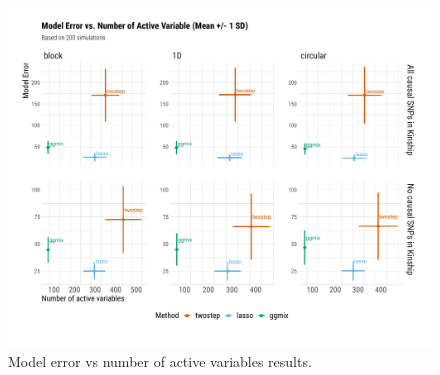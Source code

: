 \documentclass[12pt,letter]{article}\usepackage[]{graphicx}\usepackage[]{color}
\newenvironment{knitrout}{}{} %
\begin{document}
\begin{knitrout}\scriptsize
{}\color{fgcolor}\begin{figure}[H]

{\centering \includegraphics[width=1\linewidth]{figure/plot-me-nactive-sim-1} 

}

\caption[Model error vs number of active variables results]{Model error vs number of active variables results.}\label{fig:plot-me-nactive-sim}
\end{figure}


\end{knitrout}
\end{document}
